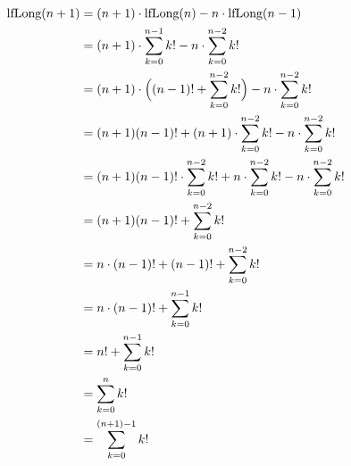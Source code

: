 \documentclass{lehramt-informatik-aufgabe}
\begin{document}
\begin{enumerate}
\begin{liAntwort}
\begin{equation*}
\begin{split}
\text{lfLong}(n+1) & = (n+1) \cdot \text{lfLong}(n) - n \cdot \text{lfLong}(n-1) \\
& = (n+1) \cdot \sum^{n-1}_{k=0}k! - n \cdot \sum^{n-2}_{k=0}k! \\
& = (n+1) \cdot \Big((n-1)! + \sum^{n-2}_{k=0}k!\Big) - n \cdot \sum^{n-2}_{k=0}k! \\
& = (n+1)(n-1)! + (n+1) \cdot \sum^{n-2}_{k=0}k! - n \cdot \sum^{n-2}_{k=0}k! \\
& = (n+1)(n-1)! \cdot \sum^{n-2}_{k=0}k! + n \cdot \sum^{n-2}_{k=0}k! - n \cdot \sum^{n-2}_{k=0}k! \\
& = (n+1)(n-1)! + \sum^{n-2}_{k=0}k! \\
& = n \cdot (n-1)! + (n-1)! + \sum^{n-2}_{k=0}k! \\
& = n \cdot (n-1)! + \sum^{n-1}_{k=0}k! \\
& = n! + \sum^{n-1}_{k=0}k! \\
& = \sum^{n}_{k=0}k! \\
& = \sum^{(n+1)-1}_{k=0}k!
\end{split}
\end{equation*}
\end{liAntwort}

\begin{liAntwort}

\end{liAntwort}

\end{enumerate}
\end{document}
